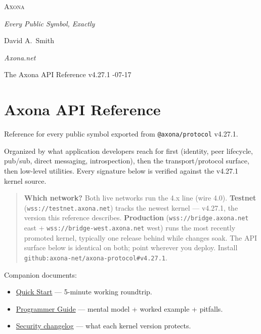 \documentclass[
  nobib]{tufte-handout}
\author{}
\date{}
\providecommand{\tightlist}{%
  \setlength{\itemsep}{0pt}\setlength{\parskip}{0pt}}
\begin{document}
\thispagestyle{empty}
\null\vfill
\begin{center}
{\fontsize{48}{52}\selectfont \textsc{Axona}\par}
\vspace{0.6em}
{\Large\itshape Every Public Symbol, Exactly\par}
\vspace{4em}
{\large David A.~Smith\par}
{\itshape\small Axona.net\par}
\vspace{2em}
{\small The Axona API Reference \quad v4.27.1 -07-17\par}
\end{center}
\vfill
\null
\newpage
\pagestyle{ndhtplain}
\thispagestyle{ndhtplain}
\setcounter{page}{1}

\section{Axona API Reference}\label{axona-api-reference}

Reference for every public symbol exported from \texttt{@axona/protocol}
v4.27.1.

Organized by what application developers reach for first (identity, peer
lifecycle, pub/sub, direct messaging, introspection), then the
transport/protocol surface, then low-level utilities. Every signature
below is verified against the v4.27.1 kernel source.

\begin{quote}
\textbf{Which network?} Both live networks run the 4.x line (wire 4.0).
\textbf{Testnet} (\texttt{wss://testnet.axona.net}) tracks the newest
kernel --- v4.27.1, the version this reference describes.
\textbf{Production} (\texttt{wss://bridge.axona.net} east +
\texttt{wss://bridge-west.axona.net} west) runs the most recently
promoted kernel, typically one release behind while changes soak. The
API surface below is identical on both; point wherever you deploy.
Install \texttt{github:axona-net/axona-protocol\#v4.27.1}.
\end{quote}

Companion documents:

\begin{itemize}
\tightlist
\item
  \href{Quick-Start-v4.27.1.md}{Quick Start} --- 5-minute working
  roundtrip.
\item
  \href{Axona-Programmer-Guide-v4.27.1.md}{Programmer Guide} --- mental
  model + worked example + pitfalls.
\item
  \href{../SECURITY-CHANGELOG.md}{Security changelog} --- what each
  kernel version protects.
\end{itemize}
\end{document}
